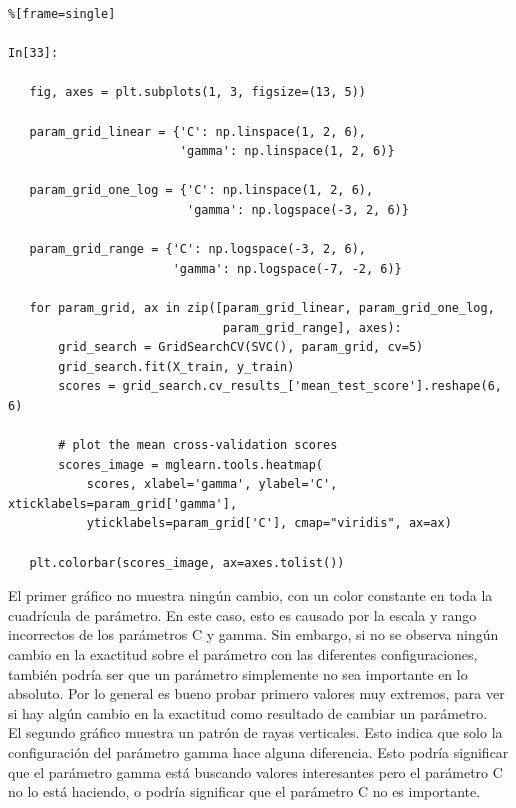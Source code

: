 \begin{lstlisting}%[frame=single]

In[33]:

   fig, axes = plt.subplots(1, 3, figsize=(13, 5))
   
   param_grid_linear = {'C': np.linspace(1, 2, 6),
                        'gamma': np.linspace(1, 2, 6)}
                        
   param_grid_one_log = {'C': np.linspace(1, 2, 6),
                         'gamma': np.logspace(-3, 2, 6)}
                         
   param_grid_range = {'C': np.logspace(-3, 2, 6),
                       'gamma': np.logspace(-7, -2, 6)}
                       
   for param_grid, ax in zip([param_grid_linear, param_grid_one_log,
                              param_grid_range], axes):
       grid_search = GridSearchCV(SVC(), param_grid, cv=5)
       grid_search.fit(X_train, y_train)
       scores = grid_search.cv_results_['mean_test_score'].reshape(6, 6)
       
       # plot the mean cross-validation scores
       scores_image = mglearn.tools.heatmap(
           scores, xlabel='gamma', ylabel='C', xticklabels=param_grid['gamma'],
           yticklabels=param_grid['C'], cmap="viridis", ax=ax)
           
   plt.colorbar(scores_image, ax=axes.tolist())

\end{lstlisting}

El primer gráfico no muestra ningún cambio, con un color constante en toda la cuadrícula de parámetro.
En este caso, esto es causado por  la escala y rango incorrectos de los parámetros C y gamma.
Sin embargo, si no se observa ningún cambio en la exactitud sobre el parámetro con las diferentes
configuraciones, también podría ser que un parámetro simplemente no sea importante en lo
absoluto. Por lo general es bueno probar primero valores muy extremos, para ver si 
hay algún cambio en la exactitud como  resultado de cambiar un parámetro.\\

El segundo gráfico  muestra un patrón de rayas verticales. Esto indica que solo la configuración
del parámetro gamma hace alguna diferencia. Esto podría significar que el parámetro gamma
está buscando valores interesantes pero el parámetro C no lo está haciendo, o podría significar
que el parámetro C no es importante.\\

